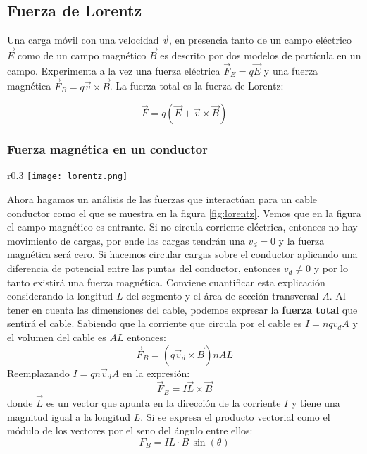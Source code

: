 \subsection{Fuerza de Lorentz}

Una carga móvil con una velocidad \(\vec{v}\), en presencia tanto de un campo eléctrico \(\vec{E}\) como de un campo magnético \(\vec{B}\) es descrito por dos modelos de partícula en un campo. Experimenta a la vez una fuerza eléctrica \(\vec{F}_E=q\vec{E}\) y una fuerza magnética \(\vec{F}_B=q\vec{v} \times \vec{B}\). La fuerza total es la fuerza de Lorentz:

\begin{equation}
  \vec{F} = q\left(\vec{E} + \vec{v} \times \vec{B}\right)
  \label{eq:f_lorentz}
\end{equation}

\subsubsection{Fuerza magnética en un conductor}
\label{sec:fuerza_magnetica_en_un_conductor}

\begin{wrapfigure}{r}{0.3\textwidth}
  \centering
  \texttt{[image: lorentz.png]}
  \caption{Un segmento de un alambre conduciendo corriente en un campo magnético \(\vec{B}\)}
  \label{fig:lorentz}
\end{wrapfigure}
Ahora hagamos un análisis de las fuerzas que interactúan para un cable conductor como el que se muestra en la figura \ref{fig:lorentz}. Vemos que en la figura el campo magnético es entrante. Si no circula corriente eléctrica, entonces no hay movimiento de cargas, por ende las cargas tendrán una \(v_d=0\) y la fuerza magnética será cero. Si hacemos circular cargas sobre el conductor aplicando una diferencia de potencial entre las puntas del conductor, entonces \(v_d \neq 0\) y por lo tanto existirá una fuerza magnética. 
Conviene cuantificar esta explicación considerando la longitud \(L\) del segmento y el área de sección transversal \(A\). Al tener en cuenta las dimensiones del cable, podemos expresar la \textbf{fuerza total} que sentirá el cable. Sabiendo que la corriente que circula por el cable es \(I = nq v_d A\) y el volumen del cable es \(AL\) entonces: 
\[
  \vec{F}_B = (q\vec{v}_d \times \vec{B})nAL
\]
Reemplazando \(I=qn \vec{v}_d A\) en la expresión:
\[
  \vec{F}_B = I\vec{L} \times \vec{B}
\]
donde \(\vec{L}\) es un vector que apunta en la dirección de la corriente \(I\) y tiene una magnitud igual a la longitud \(L\). Si se expresa el producto vectorial como el módulo de los vectores por el seno del ángulo entre ellos:
\begin{equation}
  \boxed{F_B = IL \cdot B \, \sin(\theta)}
  \label{eq:fuerza_magnetica_en_un_conductor}
\end{equation}